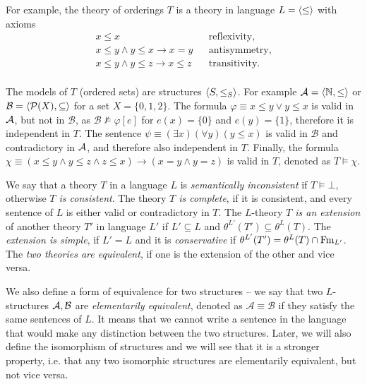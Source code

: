 
For example, the theory of orderings $T$ is a theory in language $L=\langle \leq \rangle$ with axioms
\begin{align*}
	x \leq x & & \text{reflexivity,} \\
	x \leq y \land y \leq x \to x = y & & \text{antisymmetry,} \\
	x \leq y \land y \leq z \to x \leq z & & \text{transitivity.} \\
\end{align*}

The models of $T$ (ordered sets) are structures $\langle S, \leq_S \rangle$. For example $\mathcal{A} = \langle \mathbb{N}, \leq \rangle$ or $\mathcal{B} = \langle \mathcal{P}(X), \subseteq \rangle$ for a set $X = \{0,1,2\}$. The formula $\varphi \equiv x \leq y \lor y \leq x$ is valid in $\mathcal{A}$, but not in $\mathcal{B}$, as $\mathcal{B} \nvDash \varphi[e]$ for $e(x) = \{0\}$ and $e(y)=\{1\}$, therefore it is independent in $T$. The sentence $\psi \equiv (\exists x)(\forall y)(y \leq x)$ is valid in $\mathcal{B}$ and contradictory in $\mathcal{A}$, and therefore also independent in $T$. Finally, the formula $\chi \equiv (x \leq y \land y \leq z \land z \leq x) \to (x = y \land y = z)$ is valid in $T$, denoted as $T \vDash \chi$.

We say that a theory $T$ in a language $L$ is \emph{semantically inconsistent} if $T \vDash \bot$, otherwise \emph{$T$ is consistent}. The theory \emph{$T$ is complete}, if it is consistent, and every sentence of $L$ is either valid or contradictory in $T$. The $L$-theory \emph{$T$ is an extension} of another theory $T'$ in language $L'$ if $L' \subseteq L$ and $\theta^{L'}(T') \subseteq \theta^L(T)$. The \emph{extension is simple}, if $L' = L$ and it is \emph{conservative} if $\theta^{L'}(T') = \theta^L(T) \cap \operatorname{Fm}_{L'}$. The \emph{two theories are equivalent}, if one is the extension of the other and vice versa.

We also define a form of equivalence for two structures -- we say that two $L$-structures $\mathcal{A}, \mathcal{B}$ are \emph{elementarily equivalent}, denoted as $\mathcal{A} \equiv \mathcal{B}$ if they satisfy the same sentences of $L$. It means that we cannot write a sentence in the language that would make any distinction between the two structures. Later, we will also define the isomorphism of structures and we will see that it is a stronger property, i.e. that any two isomorphic structures are elementarily equivalent, but not vice versa.


